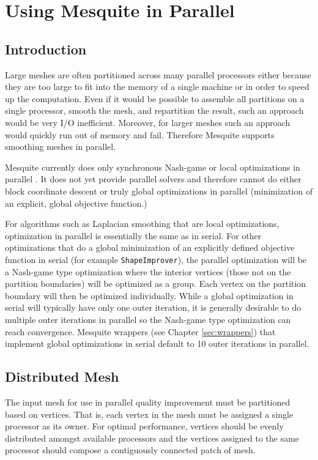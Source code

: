 \chapter{Using Mesquite in Parallel}
\label{sec:parallel}

\section{Introduction}

Large meshes are often partitioned across many parallel processors either because they are too large to fit into the memory of a single machine or in order to speed up the computation. Even if it would be possible to assemble all partitions on a single processor, smooth the mesh, and repartition the result, such an approach would be very I/O inefficient. Moreover, for larger meshes such an approach would quickly run out of memory and fail. Therefore Mesquite supports smoothing meshes in parallel.

Mesquite currently does only synchronous Nash-game or local optimizations in parallel \cite{Fr95}.  It does not yet provide parallel solvers and therefore cannot do either block coordinate descent or truly global optimizations in parallel (minimization of an explicit, global objective function.)

For algorithms such as Laplacian smoothing that are local optimizations, optimization in parallel is essentially the same as in serial.  For other optimizations that do a global minimization of an explicitly defined objective function in serial (for example \texttt{ShapeImprover}), the parallel optimization will be a Nash-game type optimization where the interior vertices (those not on the partition boundaries) will be optimized as a group.  Each vertex on the partition boundary will then be optimized individually.  While a global optimization in serial will typically have only one outer iteration, it is generally desirable to do multiple outer iterations in parallel so the Nash-game type optimization can reach convergence.  Mesquite wrappers (see Chapter \ref{sec:wrappers}) that implement global optimizations in serial default to 10 outer iterations in parallel.


\section{Distributed Mesh}

The input mesh for use in parallel quality improvement must be partitioned based on vertices.  That is, each vertex in the mesh must be assigned a single processor as its owner.  For optimal performance, vertices should be evenly distributed amongst available processors and the vertices assigned to the same processor should compose a contiguously connected patch of mesh.

